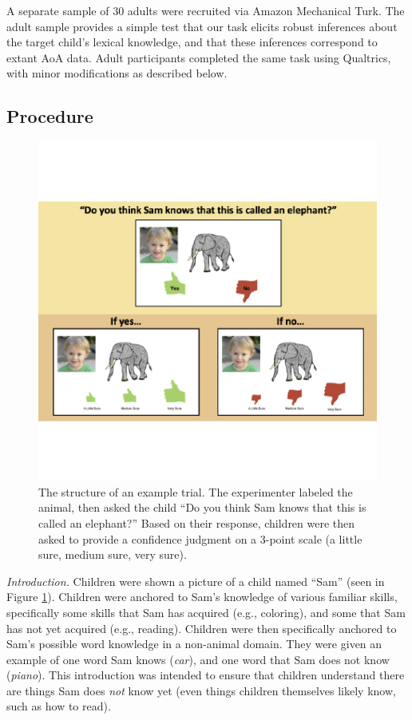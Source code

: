 \documentclass[10pt, letterpaper]{article}
\newenvironment{CodeChunk}{}{}
\begin{document}
A separate sample of 30 adults were recruited via Amazon Mechanical
Turk. The adult sample provides a simple test that our task elicits
robust inferences about the target child's lexical knowledge, and that
these inferences correspond to extant AoA data. Adult participants
completed the same task using Qualtrics, with minor modifications as
described below.

\hypertarget{procedure}{%
\subsection{Procedure}\label{procedure}}

\begin{CodeChunk}
\begin{figure}[tb]

{\centering \includegraphics{figs/task-method-1} 

}

\caption[The structure of an example trial]{The structure of an example trial. The experimenter labeled the animal, then asked the child “Do you think Sam knows that this is called an elephant?” Based on their response, children were then asked to provide a confidence judgment on a 3-point scale (a little sure, medium sure, very sure).}\label{fig:task-method}
\end{figure}
\end{CodeChunk}

\emph{Introduction.} Children were shown a picture of a child named
``Sam'' (seen in Figure \ref{fig:task-method}). Children were anchored
to Sam's knowledge of various familiar skills, specifically some skills
that Sam has acquired (e.g., coloring), and some that Sam has not yet
acquired (e.g., reading). Children were then specifically anchored to
Sam's possible word knowledge in a non-animal domain. They were given an
example of one word Sam knows (\emph{car}), and one word that Sam does
not know (\emph{piano}). This introduction was intended to ensure that
children understand there are things Sam does \emph{not} know yet (even
things children themselves likely know, such as how to read).
\end{document}
